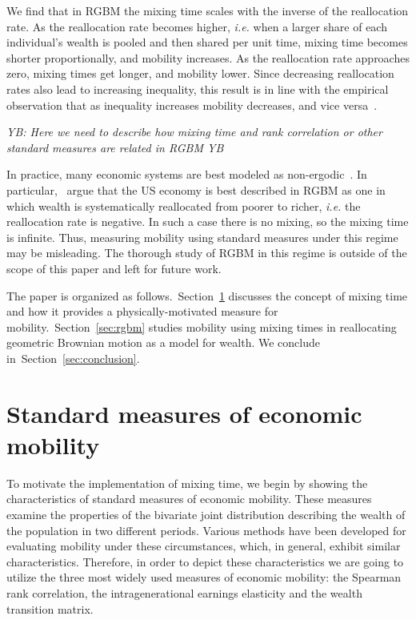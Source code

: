 \documentclass[11pt]{article}
\newcommand{\blue}[1]{{\color{blue} #1}}
\newcommand{\Sref}[1]{Section~\ref{sec:#1}}
\newcommand{\ie}{{\it i.e.}\xspace}
\newcommand{\YB}[1]{\blue{{\it YB: #1 YB}}}
\numberwithin{equation}{section}
\begin{document}
We find that in RGBM the mixing time scales with the inverse of the reallocation rate. As the reallocation rate becomes higher, \ie when a larger share of each individual's wealth is pooled and then shared per unit time, mixing time becomes shorter proportionally, and mobility increases. As the reallocation rate approaches zero, mixing times get longer, and mobility lower. Since decreasing reallocation rates also lead to increasing inequality, this result is in line with the empirical observation that as inequality increases mobility decreases, and vice versa~\citep{corak2013}.

\YB{Here we need to describe how mixing time and rank correlation or other standard measures are related in RGBM}

In practice, many economic systems are best modeled as non-ergodic~\citep{Peters2019b}. In particular,~\citet{BermanPetersAdamou2019} argue that the US economy is best described in RGBM as one in which wealth is systematically reallocated from poorer to richer, \ie the reallocation rate is negative. In such a case there is no mixing, so the mixing time is infinite. Thus, measuring mobility using standard measures under this regime may be misleading. The thorough study of RGBM in this regime is outside of the scope of this paper and left for future work.

The paper is organized as follows.~\Sref{mixingtime} discusses the concept of mixing time and how it provides a physically-motivated measure for mobility.~\Sref{rgbm} studies mobility using mixing times in reallocating geometric Brownian motion as a model for wealth. We conclude in~\Sref{conclusion}.

\section{Standard measures of economic mobility}\label{sec:mixingtime}

To motivate the implementation of mixing time, we begin by showing the characteristics of standard measures of economic mobility. These measures examine the properties of the bivariate joint distribution describing the wealth of the population in two different periods. Various methods have been developed for evaluating mobility under these circumstances, which, in general, exhibit similar characteristics. Therefore, in order to depict these characteristics we are going to utilize the three most widely used measures of economic mobility: the Spearman rank correlation, the intragenerational earnings elasticity and the wealth transition matrix.
\end{document}
